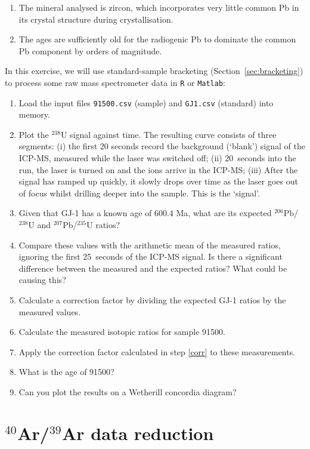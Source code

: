 \documentclass{book}
\begin{document}
\begin{enumerate}
\item The mineral analysed is zircon, which incorporates very little
  common Pb in its crystal structure during crystallisation.
\item The ages are sufficiently old for the radiogenic Pb to dominate
  the common Pb component by orders of magnitude.
\end{enumerate}

In this exercise, we will use standard-sample bracketing
(Section~\ref{sec:bracketing}) to process some raw mass spectrometer
data in \texttt{R} or \texttt{Matlab}:

\begin{enumerate}
\item Load the input files {\tt 91500.csv} (sample) and {\tt GJ1.csv}
  (standard) into memory.
\item Plot the $^{238}$U signal against time. The resulting curve
  consists of three segments: (i) the first 20 seconds record the
  background (`blank') signal of the ICP-MS, measured while the laser
  was switched off; (ii) 20~seconds into the run, the laser is turned
  on and the ions arrive in the ICP-MS; (iii) After the signal has
  ramped up quickly, it slowly drops over time as the laser goes out
  of focus whilst drilling deeper into the sample. This is the
  `signal'.
\item Given that GJ-1 has a known age of 600.4 Ma, what are its
  expected $^{206}$Pb/$^{238}$U and $^{207}$Pb/$^{235}$U ratios?
\item Compare these values with the arithmetic mean of the measured
  ratios, ignoring the first 25~seconds of the ICP-MS signal. 
  Is there a significant difference between the measured and
  the expected ratios? What could be causing this?
\item Calculate a correction factor by dividing the expected GJ-1
  ratios by the measured values. \label{corr}
\item Calculate the measured isotopic ratios for sample 91500.
\item Apply the correction factor calculated in step \ref{corr} to
  these measurements.
\item What is the age of 91500?
\item Can you plot the results on a Wetherill concordia diagram?
\end{enumerate}


\section{$^{40}$Ar/$^{39}$Ar data reduction}
\label{sec:Ar-Ar-R}
\end{document}
